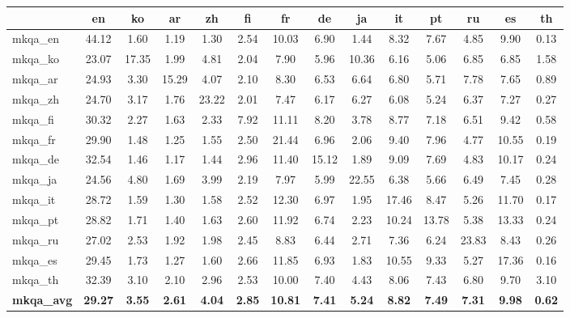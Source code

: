 \clearpage
\begin{table*}[t]
\centering
\footnotesize
\renewcommand{\arraystretch}{1.1}
\setlength{\tabcolsep}{4pt}
\begin{tabular}{lccccccccccccc}
\toprule
                & en    & ko    & ar    & zh    & fi    & fr    & de    & ja    & it    & pt    & ru    & es    & th    \\
\midrule
mkqa\_en       & 44.12 & 1.60  & 1.19  & 1.30  & 2.54  & 10.03 & 6.90  & 1.44  & 8.32  & 7.67  & 4.85  & 9.90  & 0.13  \\
mkqa\_ko       & 23.07 & 17.35 & 1.99  & 4.81  & 2.04  & 7.90  & 5.96  & 10.36 & 6.16  & 5.06  & 6.85  & 6.85  & 1.58  \\
mkqa\_ar       & 24.93 & 3.30  & 15.29 & 4.07  & 2.10  & 8.30  & 6.53  & 6.64  & 6.80  & 5.71  & 7.78  & 7.65  & 0.89  \\
mkqa\_zh       & 24.70 & 3.17  & 1.76  & 23.22 & 2.01  & 7.47  & 6.17  & 6.27  & 6.08  & 5.24  & 6.37  & 7.27  & 0.27  \\
mkqa\_fi       & 30.32 & 2.27  & 1.63  & 2.33  & 7.92  & 11.11 & 8.20  & 3.78  & 8.77  & 7.18  & 6.51  & 9.42  & 0.58  \\
mkqa\_fr       & 29.90 & 1.48  & 1.25  & 1.55  & 2.50  & 21.44 & 6.96  & 2.06  & 9.40  & 7.96  & 4.77  & 10.55 & 0.19  \\
mkqa\_de       & 32.54 & 1.46  & 1.17  & 1.44  & 2.96  & 11.40 & 15.12 & 1.89  & 9.09  & 7.69  & 4.83  & 10.17 & 0.24  \\
mkqa\_ja       & 24.56 & 4.80  & 1.69  & 3.99  & 2.19  & 7.97  & 5.99  & 22.55 & 6.38  & 5.66  & 6.49  & 7.45  & 0.28  \\
mkqa\_it       & 28.72 & 1.59  & 1.30  & 1.58  & 2.52  & 12.30 & 6.97  & 1.95  & 17.46 & 8.47  & 5.26  & 11.70 & 0.17  \\
mkqa\_pt       & 28.82 & 1.71  & 1.40  & 1.63  & 2.60  & 11.92 & 6.74  & 2.23  & 10.24 & 13.78 & 5.38  & 13.33 & 0.24  \\
mkqa\_ru       & 27.02 & 2.53  & 1.92  & 1.98  & 2.45  & 8.83  & 6.44  & 2.71  & 7.36  & 6.24  & 23.83 & 8.43  & 0.26  \\
mkqa\_es       & 29.45 & 1.73  & 1.27  & 1.60  & 2.66  & 11.85 & 6.93  & 1.83  & 10.55 & 9.33  & 5.27  & 17.36 & 0.16  \\
mkqa\_th       & 32.39 & 3.10  & 2.10  & 2.96  & 2.53  & 10.00 & 7.40  & 4.43  & 8.06  & 7.43  & 6.80  & 9.70  & 3.10  \\
\midrule
\rowcolor{gray!20} \textbf{mkqa\_avg}      & \textbf{29.27} & \textbf{3.55}  & \textbf{2.61}  & \textbf{4.04}  & \textbf{2.85}  & \textbf{10.81} & \textbf{7.41}  & \textbf{5.24}  & \textbf{8.82}  & \textbf{7.49}  & \textbf{7.31}  & \textbf{9.98}  & \textbf{0.62}  \\

\end{tabular}
\end{table*}
